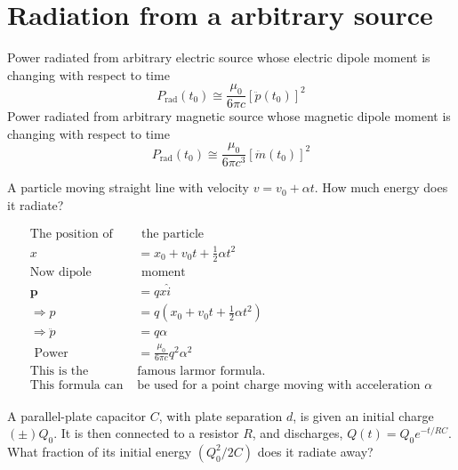 \section{Radiation from a arbitrary source}
Power radiated from arbitrary electric source whose electric dipole moment is changing with respect to time\\
$$P_{\operatorname{rad}}\left(t_{0}\right) \cong \frac{\mu_{0}}{6 \pi c}\left[\ddot{p}\left(t_{0}\right)\right]^{2}$$
Power radiated from arbitrary magnetic source whose magnetic dipole moment is changing with respect to time
$$P_{\mathrm{rad}}\left(t_{0}\right) \cong \frac{\mu_{0}}{6 \pi c^{3}}\left[\ddot{m}\left(t_{0}\right)\right]^{2}$$
\begin{exercise}
 A particle moving straight line with velocity $v=v_{0}+\alpha t$. How much energy does it radiate?
\end{exercise}
\begin{answer}
	\begin{align*}
	\text{The position of}&\text{ the particle}\\
	x&=x_{0}+v_{0} t+\frac{1}{2} \alpha t^{2}\\
	\text{Now dipole}&\text{ moment}\\
	\mathbf{p}&=q x \hat{i}\\
	\Rightarrow p&=q\left(x_{0}+v_{0} t+\frac{1}{2} \alpha t^{2}\right) \\
	\Rightarrow \ddot{p}&=q \alpha \\
	\text { Power }&=\frac{\mu_{0}}{6 \pi c} q^{2} \alpha^{2}\\
	\text{This is the }&\text{famous larmor formula.}\\
	\text{This formula can }&\text{be used for a point charge moving with acceleration $\alpha$}
	\end{align*}
\end{answer}
\begin{exercise}
	 A parallel-plate capacitor $C$, with plate separation $d$, is given an initial charge $(\pm) Q_{0}$. It is then connected to a resistor $R$, and discharges, $Q(t)=Q_{0} e^{-t / R C}$. What fraction of its initial energy $\left(Q_{0}^{2} / 2 C\right)$ does it radiate away?
\end{exercise}
